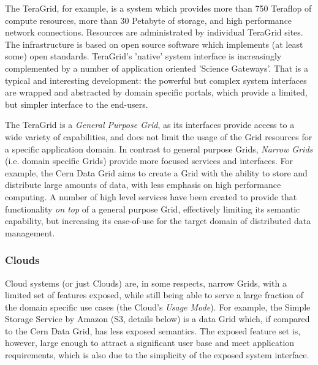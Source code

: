 \documentclass[conference,final]{IEEEtran}
\newcommand{\I}[1]{\textit{#1}}
\newcommand{\jha}[0]{}
\begin{document}
   The TeraGrid\cite{teraGrid}, for example, is a system which
   provides more than 750 Teraflop of compute resources, more than 30
   Petabyte of storage, and high performance network connections.
   Resources are administrated by individual TeraGrid sites.  The
   infrastructure is based on open source software which implements
   (at least some) open standards.  TeraGrid's 'native' system
   interface is increasingly complemented by a number of application
   oriented 'Science Gateways'.  That is a typical and interesting
   development: the powerful but complex system interfaces are wrapped
   and abstracted by domain specific portals, which provide a limited,
   but simpler interface to the end-users.

   The TeraGrid is a \I{General Purpose Grid}, as its interfaces
   provide access to a wide variety of capabilities, and does not
   limit the usage of the Grid resources for a specific application
   domain.  In contrast to general purpose Grids, \I{Narrow Grids}
   (i.e.  domain specific Grids) provide more focused services and
   interfaces.  For example, the Cern Data Grid aims to create a Grid
   with the ability to store and distribute large amounts of data,
   with less emphasis on high performance computing.  A number of high
   level services have been created to provide that functionality
   \I{on top} of a general purpose Grid, effectively limiting its
   semantic capability, but increasing its ease-of-use for the target
   domain of distributed data management.



  \subsubsection{Clouds}

   Cloud systems (or just Clouds) are, in some respects, narrow Grids,
   with a limited set of features exposed, while still being able to
   serve a large fraction of the domain specific use cases (the
   Cloud's \I{Usage Mode}).  For example, the Simple Storage Service
   by Amazon\cite{amazon-s3} (S3, details below) is a data Grid which,
   if compared to the Cern Data Grid, has less exposed semantics.  The
   exposed feature set is, however, large enough to attract a
   significant user base and meet application requirements, which is
   also due to the simplicity of the exposed system interface.
\end{document}
